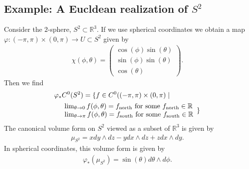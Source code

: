 \documentclass[letterpaper, 12 pt]{amsart}
\newcommand{\R}{\mathbb{R}}
\begin{document}
  
  \subsection{Example: A Eucldean realization of $S^2$}
  Consider the $2$-sphere, $S^2 \subset \R^3$.
  If we use spherical coordinates we obtain a map
  $\varphi: (-\pi,\pi) \times (0,\pi) \to U \subset S^2$
  given by
  \begin{align*}
    \chi(\phi,\theta) = \begin{pmatrix}
      \cos(\phi) \sin(\theta) \\
      \sin(\phi) \sin(\theta) \\
      \cos(\theta)
      \end{pmatrix}.
  \end{align*}
  Then we find
  \begin{align*}
    &\varphi_*C^0(S^2) = \{
      f \in C^0( (-\pi,\pi)\times (0,\pi) \mid \\
    &\quad \begin{array}{l}
      \lim_{\theta \to 0} f(\phi,\theta) = f_{\rm north} \text{ for some } f_{\rm north} \in \R \\
      \lim_{\theta \to \pi} f(\phi,\theta) = f_{\rm south} \text{ for some } f_{\rm south} \in \R 
    \end{array}
    \}
  \end{align*}
  The canonical volume form on $S^2$ viewed as a subset of $\R^3$ is 
  given by
  \begin{align*}
    \mu_{S^2} = x dy \wedge dz - y dx \wedge dz + z dx \wedge dy.
  \end{align*}
  In spherical coordinates, this volume form is given by
  \begin{align*}
    \varphi_*(\mu_{S^2}) = \sin(\theta) d\theta \wedge d\phi.
  \end{align*}
\end{document}
